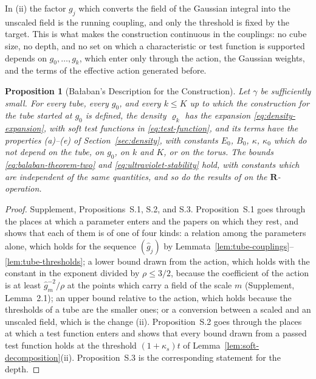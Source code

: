 \documentclass[11pt]{preprint}
\numberwithin{equation}{section}
\newtheorem{proposition}[theorem]{Proposition}
\theoremstyle{definition}
\theoremstyle{remark}
\theoremstyle{plain}
\begin{document}
In (ii) the factor $g_j$ which converts the field of the Gaussian integral into the unscaled field is the running coupling, and only the threshold is fixed by the target. This is what makes the construction continuous in the couplings: no cube size, no depth, and no set on which a characteristic or test function is supported depends on $g_0, \dots, g_k$, which enter only through the action, the Gaussian weights, and the terms of the effective action generated before.

\begin{proposition}[Ba{\l}aban's Description for the Construction]\label{prop:construction-admissible}
Let $\gamma$ be sufficiently small. For every tube, every $g_0$, and every $k \leq K$ up to which the construction for the tube started at $g_0$ is defined, the density $\varrho_k$ has the expansion \eqref{eq:density-expansion}, with soft test functions in \eqref{eq:test-function}, and its terms have the properties (a)--(e) of Section~\ref{sec:density}, with constants $E_0$, $B_0$, $\kappa$, $\kappa_0$ which do not depend on the tube, on $g_0$, on $k$ and $K$, or on the torus. The bounds \eqref{eq:balaban-theorem-two} and \eqref{eq:ultraviolet-stability} hold, with constants which are independent of the same quantities, and so do the results of \cite{BalabanLFR1,BalabanLFR2} on the $\mathbf R$-operation.
\end{proposition}

\begin{proof}
Supplement, Propositions~S.1, S.2, and S.3. Proposition~S.1 goes through the places at which a parameter enters \cite{BalabanCRE,BalabanLFR1,BalabanLFR2} and the papers on which they rest, and shows that each of them is of one of four kinds: a relation among the parameters alone, which holds for the sequence $(\hat g_j)$ by Lemmata~\ref{lem:tube-couplings}--\ref{lem:tube-thresholds}; a lower bound drawn from the action, which holds with the constant in the exponent divided by $\rho \leq 3/2$, because the coefficient of the action is at least $\hat g_m^{-2}/\rho$ at the points which carry a field of the scale $m$ (Supplement, Lemma~2.1); an upper bound relative to the action, which holds because the thresholds of a tube are the smaller ones; or a conversion between a scaled and an unscaled field, which is the change (ii). Proposition~S.2 goes through the places at which a test function enters and shows that every bound drawn from a passed test function holds at the threshold $(1 + \kappa_s)t$ of Lemma~\ref{lem:soft-decomposition}(ii). Proposition~S.3 is the corresponding statement for the depth.
\end{proof}
\end{document}
